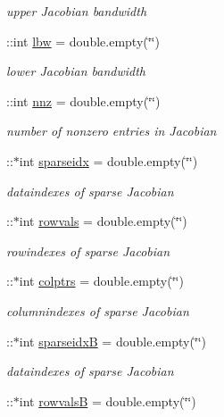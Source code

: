 \begin{DoxyCompactItemize}
\begin{DoxyCompactList}\small\item\em upper Jacobian bandwidth \end{DoxyCompactList}\item 
\+::int \hyperlink{classamimodel_a784f5fb2b8eda576179be087c2a09a39}{lbw} = double.\+empty(\char`\"{}\char`\"{})
\begin{DoxyCompactList}\small\item\em lower Jacobian bandwidth \end{DoxyCompactList}\item 
\+::int \hyperlink{classamimodel_a825ec588729c090ff51ea3473dcbc6b9}{nnz} = double.\+empty(\char`\"{}\char`\"{})
\begin{DoxyCompactList}\small\item\em number of nonzero entries in Jacobian \end{DoxyCompactList}\item 
\+::$\ast$int \hyperlink{classamimodel_a6ffb112eda9ff756e17104210981b30b}{sparseidx} = double.\+empty(\char`\"{}\char`\"{})
\begin{DoxyCompactList}\small\item\em dataindexes of sparse Jacobian \end{DoxyCompactList}\item 
\+::$\ast$int \hyperlink{classamimodel_aa0abea3560da3f409a28567f42d52872}{rowvals} = double.\+empty(\char`\"{}\char`\"{})
\begin{DoxyCompactList}\small\item\em rowindexes of sparse Jacobian \end{DoxyCompactList}\item 
\+::$\ast$int \hyperlink{classamimodel_a887e8a11654afa197d040d8bb10cbb38}{colptrs} = double.\+empty(\char`\"{}\char`\"{})
\begin{DoxyCompactList}\small\item\em columnindexes of sparse Jacobian \end{DoxyCompactList}\item 
\+::$\ast$int \hyperlink{classamimodel_adcfae93a688a66f1954d0832f51e4cc0}{sparseidx\+B} = double.\+empty(\char`\"{}\char`\"{})
\begin{DoxyCompactList}\small\item\em dataindexes of sparse Jacobian \end{DoxyCompactList}\item 
\+::$\ast$int \hyperlink{classamimodel_a1ba81ee0e28fe7c7576911973c82be70}{rowvals\+B} = double.\+empty(\char`\"{}\char`\"{})

\end{DoxyCompactItemize}
